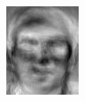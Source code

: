 \begin{frame}
\begin{columns}
\begin{overlayarea}{\textwidth}{\textheight}
{        \begin{minipage}[t]{0.15\textwidth}
          \includegraphics[width=\textwidth]{images/eig_docked_image/eig_13.jpeg}
        \end{minipage}
        \begin{minipage}[t]{0.15\textwidth}

\end{minipage}}
\end{overlayarea}
\end{columns}
\end{frame}
